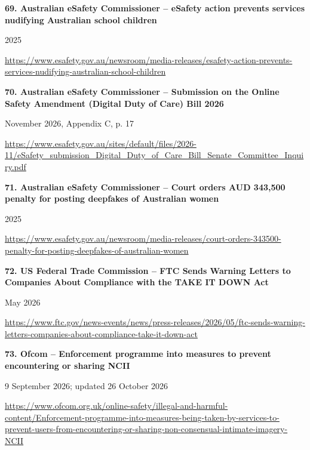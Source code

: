 \documentclass[11pt,a4paper]{article}
\begin{document}
\noindent\begin{minipage}{\linewidth}\textbf{69. Australian eSafety Commissioner -- eSafety action prevents services nudifying Australian school children}\par{\small 2025\par\url{https://www.esafety.gov.au/newsroom/media-releases/esafety-action-prevents-services-nudifying-australian-school-children}}\par\end{minipage}\par\vspace{2mm}
\noindent\begin{minipage}{\linewidth}\textbf{70. Australian eSafety Commissioner -- Submission on the Online Safety Amendment (Digital Duty of Care) Bill 2026}\par{\small November 2026, Appendix C, p. 17\par\url{https://www.esafety.gov.au/sites/default/files/2026-11/eSafety_submission_Digital_Duty_of_Care_Bill_Senate_Committee_Inquiry.pdf}}\par\end{minipage}\par\vspace{2mm}
\noindent\begin{minipage}{\linewidth}\textbf{71. Australian eSafety Commissioner -- Court orders AUD 343,500 penalty for posting deepfakes of Australian women}\par{\small 2025\par\url{https://www.esafety.gov.au/newsroom/media-releases/court-orders-343500-penalty-for-posting-deepfakes-of-australian-women}}\par\end{minipage}\par\vspace{2mm}
\noindent\begin{minipage}{\linewidth}\textbf{72. US Federal Trade Commission -- FTC Sends Warning Letters to Companies About Compliance with the TAKE IT DOWN Act}\par{\small May 2026\par\url{https://www.ftc.gov/news-events/news/press-releases/2026/05/ftc-sends-warning-letters-companies-about-compliance-take-it-down-act}}\par\end{minipage}\par\vspace{2mm}
\noindent\begin{minipage}{\linewidth}\textbf{73. Ofcom -- Enforcement programme into measures to prevent encountering or sharing NCII}\par{\small 9 September 2026; updated 26 October 2026\par\url{https://www.ofcom.org.uk/online-safety/illegal-and-harmful-content/Enforcement-programme-into-measures-being-taken-by-services-to-prevent-users-from-encountering-or-sharing-non-consensual-intimate-imagery-NCII}}\par\end{minipage}\par\vspace{2mm}
\end{document}
